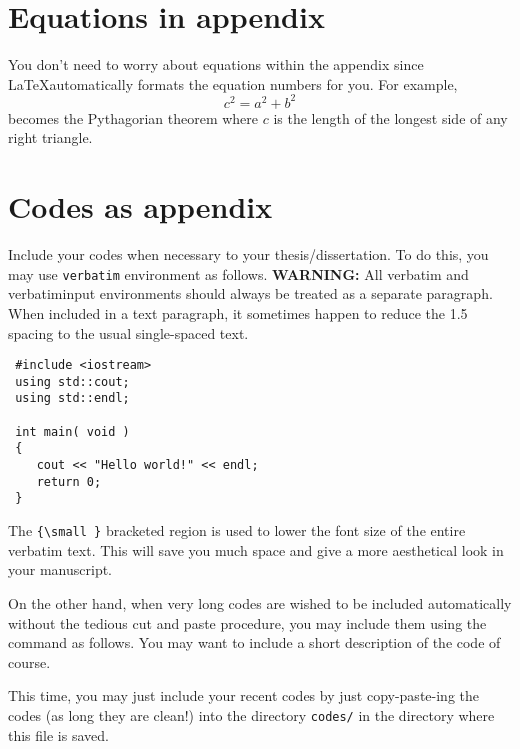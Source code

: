 \section{Equations in appendix}

\hspace{\parindent} You don't need to worry about equations within
the appendix since \LaTeX automatically formats the equation
numbers for you. For example,
\begin{equation}\label{eq:appendixEqn}
    c^2 = a^2 + b^2
\end{equation}
becomes the Pythagorian theorem where $c$ is the length of the
longest side of any right triangle.

\section{Codes as appendix}

\hspace{\parindent}Include your codes when necessary to your
thesis/dissertation. To do this, you may use \verb+verbatim+
environment as follows. \textbf{WARNING:} All verbatim and
verbatiminput environments should always be treated as a separate
paragraph.  When included in a text paragraph, it sometimes happen
to reduce the 1.5 spacing to the usual single-spaced text.

{\small
\begin{verbatim}
 #include <iostream>
 using std::cout;
 using std::endl;

 int main( void )
 {
    cout << "Hello world!" << endl;
    return 0;
 }
\end{verbatim}
}

The \verb+{\small }+ bracketed region is used to lower the font
size of the entire verbatim text.  This will save you much space
and give a more aesthetical look in your manuscript.

On the other hand, when very long codes are wished to be included
automatically without the tedious cut and paste procedure, you may
include them using the \verb++ command as follows.
You may want to include a short description of the code of course.

{\small
 
}

This time, you may just include your recent codes by just
copy-paste-ing the codes (as long they are clean!) into the
directory \verb$codes/$ in the directory where this file is saved.
